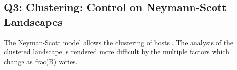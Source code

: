 \documentclass[11pt,letterpaper]{article}
\begin{document}
{%







 
 







%


\newpage
\FloatBarrier
\subsection*{Q3: Clustering: Control on Neymann-Scott Landscapes}

The Neyman-Scott model allows the clustering of hosts \cite{vandenBosch2024}. The analysis of the clustered landscape is rendered more difficult by the multiple factors which change as frac(B) varies. 

}
\end{document}
